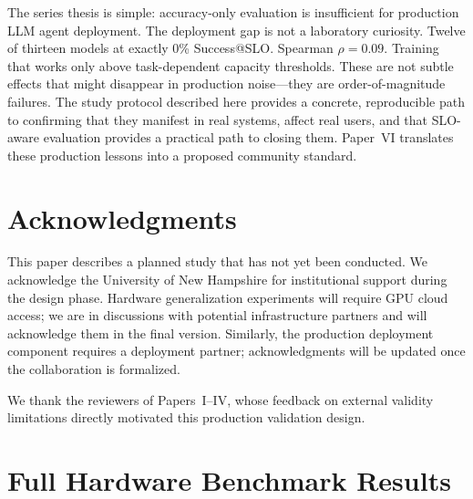 \documentclass[11pt]{article}
\begin{document}
The series thesis is simple: accuracy-only evaluation is insufficient for production LLM agent deployment. The deployment gap is not a laboratory curiosity. Twelve of thirteen models at exactly 0\% Success@SLO. Spearman $\rho = 0.09$. Training that works only above task-dependent capacity thresholds. These are not subtle effects that might disappear in production noise---they are order-of-magnitude failures. The study protocol described here provides a concrete, reproducible path to confirming that they manifest in real systems, affect real users, and that SLO-aware evaluation provides a practical path to closing them. Paper~VI translates these production lessons into a proposed community standard.

\section*{Acknowledgments}

This paper describes a planned study that has not yet been conducted. We acknowledge the University of New Hampshire for institutional support during the design phase. Hardware generalization experiments will require GPU cloud access; we are in discussions with potential infrastructure partners and will acknowledge them in the final version. Similarly, the production deployment component requires a deployment partner; acknowledgments will be updated once the collaboration is formalized.

We thank the reviewers of Papers~I--IV, whose feedback on external validity limitations directly motivated this production validation design.




\appendix

\section{Full Hardware Benchmark Results}
\label{app:hardware}
\end{document}
